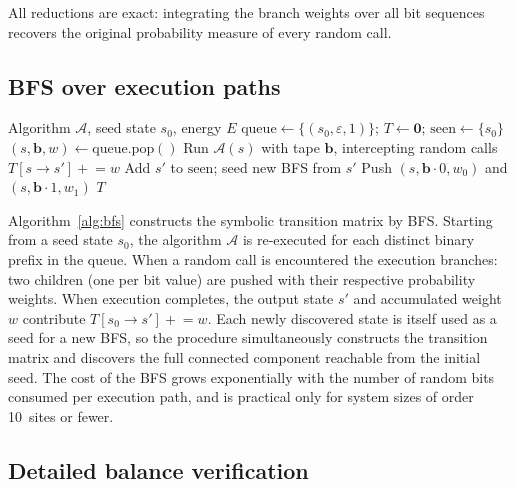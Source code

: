 \documentclass[twocolumn,10pt]{article}
\begin{document}
All reductions are exact: integrating the branch weights over all bit sequences
recovers the original probability measure of every random call.

\subsection{BFS over execution paths}

\begin{algorithm}[t]
\caption{Symbolic transition-matrix construction}
\label{alg:bfs}
\begin{algorithmic}[1]
\Require Algorithm $\mathcal{A}$, seed state $s_0$, energy $E$
\State $\mathrm{queue}\leftarrow\{(s_0,\varepsilon,1)\}$;\;
       $T\leftarrow\mathbf{0}$;\;
       $\mathrm{seen}\leftarrow\{s_0\}$
  \State $(s,\mathbf{b},w)\leftarrow\mathrm{queue.pop}()$
  \State Run $\mathcal{A}(s)$ with tape $\mathbf{b}$, intercepting random calls
    \State $T[s\to s']\mathrel{+}=w$
      \State Add $s'$ to $\mathrm{seen}$;\; seed new BFS from $s'$
    \EndIf
    \State Push $(s,\mathbf{b}{\cdot}0,w_0)$ and $(s,\mathbf{b}{\cdot}1,w_1)$
  \EndIf
\EndWhile
\State \Return $T$
\end{algorithmic}
\end{algorithm}

Algorithm~\ref{alg:bfs} constructs the symbolic transition matrix by BFS.
Starting from a seed state $s_0$, the algorithm $\mathcal{A}$ is re-executed
for each distinct binary prefix in the queue.  When a random call is
encountered the execution branches: two children (one per bit value) are
pushed with their respective probability weights.  When execution completes,
the output state $s'$ and accumulated weight $w$ contribute $T[s_0\to
s']\mathrel{+}=w$.  Each newly discovered state is itself used as a seed for a
new BFS, so the procedure simultaneously constructs the transition matrix and
discovers the full connected component reachable from the initial seed.  The
cost of the BFS grows exponentially with the number of random bits consumed per
execution path, and is practical only for system sizes of order 10~sites or
fewer.

\subsection{Detailed balance verification}
\label{sec:dbcheck}
\end{document}
